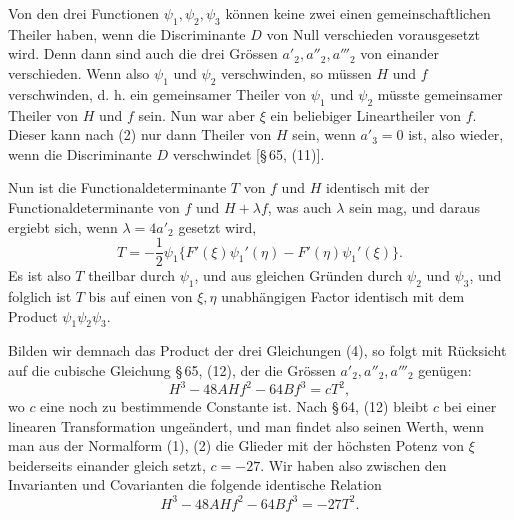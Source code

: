 \documentclass[11pt]{article}
\begin{document}
Von den drei Functionen $\psi_1,\psi_2,\psi_3$ können keine zwei einen gemeinschaftlichen Theiler haben, wenn die Discriminante $D$ von Null verschieden vorausgesetzt wird. Denn dann sind auch die drei Grössen $a'_2,a''_2,a'''_2$ von einander verschieden. Wenn also $\psi_1$ und $\psi_2$ verschwinden, so müssen $H$ und $f$ verschwinden, d. h. ein gemeinsamer Theiler von $\psi_1$ und $\psi_2$ müsste gemeinsamer Theiler von $H$ und $f$ sein. Nun war aber $\xi$ ein beliebiger Lineartheiler von $f$. Dieser kann nach (2) nur dann Theiler von $H$ sein, wenn $a'_3=0$ ist, also wieder, wenn die Discriminante $D$ verschwindet [\S\,65, (11)].

Nun ist die Functionaldeterminante $T$ von $f$ und $H$ identisch mit der Functionaldeterminante von $f$ und $H+\lambda f$, was auch $\lambda$ sein mag, und daraus ergiebt sich, wenn $\lambda=4a'_2$ gesetzt wird,
\[
 T=-\frac12\psi_1\{F'(\xi)\psi_1'(\eta)-F'(\eta)\psi_1'(\xi)\}.
\]
Es ist also $T$ theilbar durch $\psi_1$, und aus gleichen Gründen durch $\psi_2$ und $\psi_3$, und folglich ist $T$ bis auf einen von $\xi,\eta$ unabhängigen Factor identisch mit dem Product $\psi_1\psi_2\psi_3$.

Bilden wir demnach das Product der drei Gleichungen (4), so folgt mit Rücksicht auf die cubische Gleichung \S\,65, (12), der die Grössen $a'_2,a''_2,a'''_2$ genügen:
\[
 H^3-48AHf^2-64Bf^3=cT^2,
\]
wo $c$ eine noch zu bestimmende Constante ist. Nach \S\,64, (12) bleibt $c$ bei einer linearen Transformation ungeändert, und man findet also seinen Werth, wenn man aus der Normalform (1), (2) die Glieder mit der höchsten Potenz von $\xi$ beiderseits einander gleich setzt, $c=-27$. Wir haben also zwischen den Invarianten und Covarianten die folgende identische Relation
\begin{equation}
 H^3-48AHf^2-64Bf^3=-27T^2.
\tag{5}
\end{equation}
\end{document}
